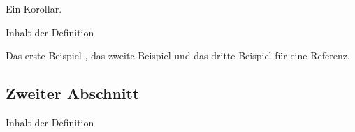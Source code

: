 \documentclass[a4paper,ngerman]{atseminar}
\begin{document}
\begin{corollary}
 Ein Korollar.
\end{corollary}


\begin{definition}
Inhalt der Definition
\end{definition}

Das erste Beispiel \cite{example1}, das zweite Beispiel
\cite{example2} und  das dritte Beispiel \cite{example3, example4}
für eine Referenz.

\subsection{Zweiter Abschnitt}


\begin{definition}
Inhalt der Definition
\end{definition}









\end{document}
